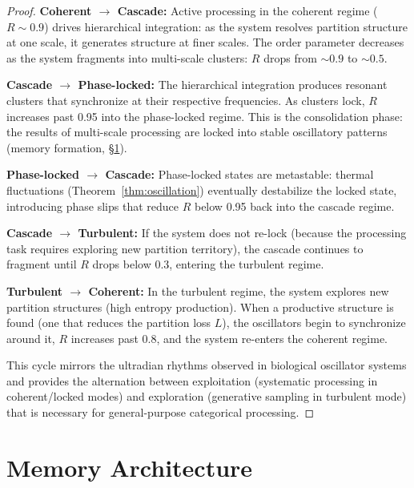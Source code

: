\documentclass[twocolumn,10pt]{article}
\theoremstyle{remark}
\begin{document}
\begin{proof}
\textbf{Coherent $\to$ Cascade:} Active processing in the coherent regime ($R \sim 0.9$) drives hierarchical integration: as the system resolves partition structure at one scale, it generates structure at finer scales. The order parameter decreases as the system fragments into multi-scale clusters: $R$ drops from $\sim 0.9$ to $\sim 0.5$.

\textbf{Cascade $\to$ Phase-locked:} The hierarchical integration produces resonant clusters that synchronize at their respective frequencies. As clusters lock, $R$ increases past 0.95 into the phase-locked regime. This is the consolidation phase: the results of multi-scale processing are locked into stable oscillatory patterns (memory formation, \S\ref{sec:memory}).

\textbf{Phase-locked $\to$ Cascade:} Phase-locked states are metastable: thermal fluctuations (Theorem~\ref{thm:oscillation}) eventually destabilize the locked state, introducing phase slips that reduce $R$ below 0.95 back into the cascade regime.

\textbf{Cascade $\to$ Turbulent:} If the system does not re-lock (because the processing task requires exploring new partition territory), the cascade continues to fragment until $R$ drops below 0.3, entering the turbulent regime.

\textbf{Turbulent $\to$ Coherent:} In the turbulent regime, the system explores new partition structures (high entropy production). When a productive structure is found (one that reduces the partition loss $L$), the oscillators begin to synchronize around it, $R$ increases past 0.8, and the system re-enters the coherent regime.

This cycle mirrors the ultradian rhythms observed in biological oscillator systems \cite{strogatz2000} and provides the alternation between exploitation (systematic processing in coherent/locked modes) and exploration (generative sampling in turbulent mode) that is necessary for general-purpose categorical processing.
\end{proof}

\section{Memory Architecture}
\label{sec:memory}
\end{document}
